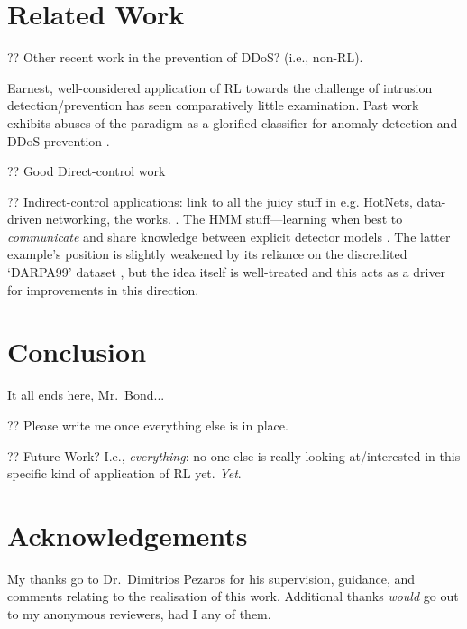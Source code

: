 \documentclass[conference, letterpaper, 10pt, times]{IEEEtran}
\begin{document}
\section{Related Work}

?? Other recent work in the prevention of DDoS? (i.e., non-RL).

Earnest, well-considered application of RL towards the challenge of intrusion detection/prevention has seen comparatively little examination.
Past work exhibits abuses of the paradigm as a glorified classifier for anomaly detection \cite{shamshirband2014anomaly} and DDoS prevention \cite{DBLP:conf/mates/ServinK08}.

?? Good Direct-control work \cite{DBLP:phd/ethos/Malialis14, DBLP:journals/eaai/MalialisK15}

?? Indirect-control applications: link to all the juicy stuff in e.g. HotNets, data-driven networking, the works. \cite{DBLP:conf/hotnets/ValadarskySST17, DBLP:conf/hotnets/MaoAMK16}.
The HMM stuff---learning when best to \emph{communicate} and share knowledge between explicit detector models \cite{DBLP:conf/paisi/XuSH07}.
The latter example's position is slightly weakened by its reliance on the discredited `DARPA99' dataset \cite{DARPA-IDD, DBLP:conf/cisda/TavallaeeBLG09, DBLP:conf/sp/SommerP10}, but the idea itself is well-treated and this acts as a driver for improvements in this direction.

\section{Conclusion}

It all ends here, Mr.\ Bond...

?? Please write me once everything else is in place.

?? Future Work? I.e., \emph{everything}: no one else is really looking at/interested in this specific kind of application of RL yet. \emph{Yet}.

\section*{Acknowledgements}
My thanks go to Dr.\ Dimitrios Pezaros for his supervision, guidance, and comments relating to the realisation of this work.
Additional thanks \emph{would} go out to my anonymous reviewers, had I any of them.

\printbibliography
\end{document}
